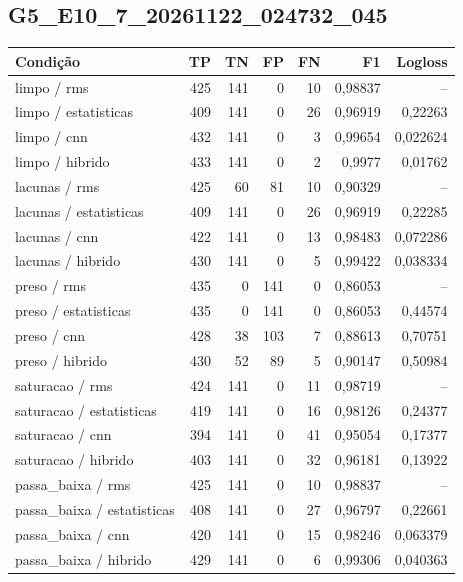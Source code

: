\subsection{G5\_E10\_7\_20261122\_024732\_045}
\small\begin{longtable}{@{}p{.38\linewidth}rrrrrr@{}}
\toprule Condição & TP & TN & FP & FN & F1 & Logloss\\\midrule\endhead
limpo /\allowbreak{} rms & 425 & 141 & 0 & 10 & 0,98837 & --\\
limpo /\allowbreak{} estatisticas & 409 & 141 & 0 & 26 & 0,96919 & 0,22263\\
limpo /\allowbreak{} cnn & 432 & 141 & 0 & 3 & 0,99654 & 0,022624\\
limpo /\allowbreak{} hibrido & 433 & 141 & 0 & 2 & 0,9977 & 0,01762\\
lacunas /\allowbreak{} rms & 425 & 60 & 81 & 10 & 0,90329 & --\\
lacunas /\allowbreak{} estatisticas & 409 & 141 & 0 & 26 & 0,96919 & 0,22285\\
lacunas /\allowbreak{} cnn & 422 & 141 & 0 & 13 & 0,98483 & 0,072286\\
lacunas /\allowbreak{} hibrido & 430 & 141 & 0 & 5 & 0,99422 & 0,038334\\
preso /\allowbreak{} rms & 435 & 0 & 141 & 0 & 0,86053 & --\\
preso /\allowbreak{} estatisticas & 435 & 0 & 141 & 0 & 0,86053 & 0,44574\\
preso /\allowbreak{} cnn & 428 & 38 & 103 & 7 & 0,88613 & 0,70751\\
preso /\allowbreak{} hibrido & 430 & 52 & 89 & 5 & 0,90147 & 0,50984\\
saturacao /\allowbreak{} rms & 424 & 141 & 0 & 11 & 0,98719 & --\\
saturacao /\allowbreak{} estatisticas & 419 & 141 & 0 & 16 & 0,98126 & 0,24377\\
saturacao /\allowbreak{} cnn & 394 & 141 & 0 & 41 & 0,95054 & 0,17377\\
saturacao /\allowbreak{} hibrido & 403 & 141 & 0 & 32 & 0,96181 & 0,13922\\
passa\_baixa /\allowbreak{} rms & 425 & 141 & 0 & 10 & 0,98837 & --\\
passa\_baixa /\allowbreak{} estatisticas & 408 & 141 & 0 & 27 & 0,96797 & 0,22661\\
passa\_baixa /\allowbreak{} cnn & 420 & 141 & 0 & 15 & 0,98246 & 0,063379\\
passa\_baixa /\allowbreak{} hibrido & 429 & 141 & 0 & 6 & 0,99306 & 0,040363\\

\end{longtable}

